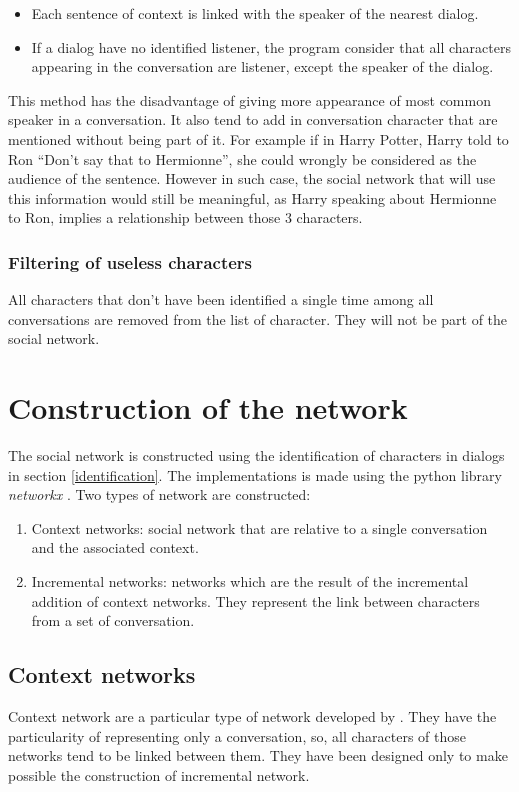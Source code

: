 \documentclass[a4paper, 12pt]{report}
\begin{document}
\begin{itemize}
\item Each sentence of context is linked with the speaker of the nearest dialog.

\item If a dialog have no identified listener, the program consider that all characters appearing in the conversation are listener, except the speaker of the dialog.
\end{itemize}
This method has the disadvantage of giving more appearance of most common speaker in a conversation. It also tend to add in conversation character that are mentioned without being part of it. For example if in Harry Potter, Harry told to Ron ``Don't say that to Hermionne'', she could wrongly be considered as the audience of the sentence. However in such case, the social network that will use this information would still be meaningful, as Harry speaking about Hermionne to Ron, implies a relationship between those 3 characters.


\subsubsection{Filtering of useless characters}
All characters that don't have been identified a single time among all conversations are removed from the list of character. They will not be part of the social network.



\section{Construction of the network}
The social network is constructed using the identification of characters in dialogs in section \ref{identification}. The implementations is made using the python library \textit{networkx} \citep{networkx}.
Two types of network are constructed:
\begin{enumerate}
\item Context networks: social network that are relative to a single conversation and the associated context. 
\item Incremental networks: networks which are the result of the incremental addition of context networks. They represent the link between characters from a set of conversation.
\end{enumerate}
\subsection{Context networks}
Context network are a particular type of network developed by \cite{original}. They have the particularity of representing only a conversation, so, all characters of those networks tend to be linked between them. They have been designed only to make possible the construction of incremental network. \\
\end{document}
